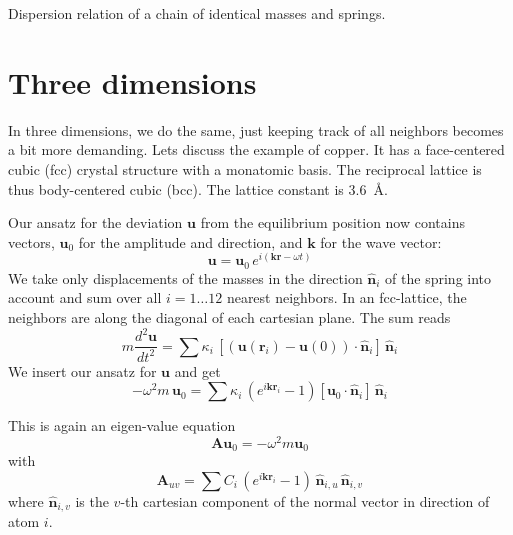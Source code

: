 \begin{marginfigure}

\caption{Dispersion relation of a chain of identical masses and springs.}
\end{marginfigure}




\section{Three dimensions}

In three dimensions, we do the same, just keeping track of all neighbors becomes a bit more demanding. Lets discuss the example of 
copper. It has  a face-centered cubic (fcc) crystal structure with a monatomic basis. The reciprocal lattice is thus  body-centered cubic (bcc). The lattice constant is 3.6~\AA.

Our ansatz for the deviation $\mathbf{u}$ from the equilibrium position now contains vectors, $\mathbf{u}_0$ for the amplitude and direction, and $\mathbf{k}$ for the wave vector:
\begin{equation}
  \mathbf{u} = \mathbf{u}_0 \, e^{i ( \mathbf{k} \mathbf{r} - \omega t)}
\end{equation}
We take only displacements of the masses in the direction $\mathbf{\hat{n}}_i$ of the spring into account and sum over all $i=1 \dots 12$ nearest neighbors. In an fcc-lattice, the neighbors are along the diagonal of each cartesian plane. The sum reads
\begin{equation}
m \frac{d^2 \mathbf{u}}{dt^2} = \sum \kappa_{i} \, [ (\mathbf{u}(\mathbf{r}_i) - \mathbf{u}(0) ) \cdot \mathbf{\hat{n}}_i ]\,  \mathbf{\hat{n}}_i 
\end{equation}
We insert our ansatz for  $\mathbf{u}$ and get
\begin{equation}
  - \omega^2 m \, \mathbf{u}_0 
 = \sum \kappa_{i} \,  ( e^{i \mathbf{k} \mathbf{r}_i } - 1) [\mathbf{u}_0 \cdot \mathbf{\hat{n}}_i ]\,  \mathbf{\hat{n}}_i 
\end{equation}

This is again an eigen-value equation
\begin{equation}
\mathbf{A} \mathbf{u}_0 = - \omega^2 m \mathbf{u}_0
\end{equation}
with 
\begin{equation}
\mathbf{A}_{uv} = \sum C_{i} \,  ( e^{i \mathbf{k} \mathbf{r}_i } - 1)  \, \mathbf{\hat{n}}_{i, u} \, \mathbf{\hat{n}}_{i, v}
\end{equation}
where $\mathbf{\hat{n}}_{i, v}$ is the $v$-th cartesian component of the normal vector in direction of atom $i$.


